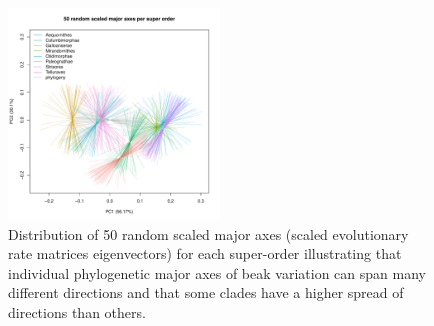\documentclass[12pt,a4paper]{article}
\begin{document}
\begin{figure}[H]
\centering
   \includegraphics[width=0.5\textwidth]{Figures/50_random_axes_superorders.pdf}
\caption{Distribution of 50 random scaled major axes (scaled evolutionary rate matrices eigenvectors) for each super-order illustrating that individual phylogenetic major axes of beak variation can span many different directions and that some clades have a higher spread of directions than others.}
\label{Fig:mikado}
\end{figure}
\end{document}
